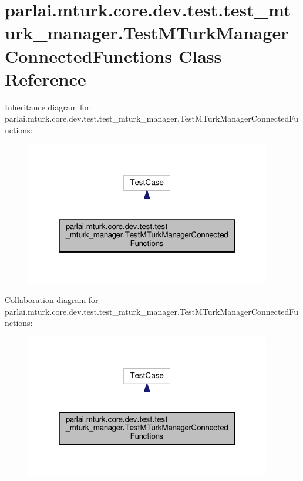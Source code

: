 \hypertarget{classparlai_1_1mturk_1_1core_1_1dev_1_1test_1_1test__mturk__manager_1_1TestMTurkManagerConnectedFunctions}{}\section{parlai.\+mturk.\+core.\+dev.\+test.\+test\+\_\+mturk\+\_\+manager.\+Test\+M\+Turk\+Manager\+Connected\+Functions Class Reference}
\label{classparlai_1_1mturk_1_1core_1_1dev_1_1test_1_1test__mturk__manager_1_1TestMTurkManagerConnectedFunctions}


Inheritance diagram for parlai.\+mturk.\+core.\+dev.\+test.\+test\+\_\+mturk\+\_\+manager.\+Test\+M\+Turk\+Manager\+Connected\+Functions\+:
\nopagebreak
\begin{figure}[H]
\begin{center}
\leavevmode
\includegraphics[width=304pt]{d4/d2d/classparlai_1_1mturk_1_1core_1_1dev_1_1test_1_1test__mturk__manager_1_1TestMTurkManagerConnectedFunctions__inherit__graph}
\end{center}
\end{figure}


Collaboration diagram for parlai.\+mturk.\+core.\+dev.\+test.\+test\+\_\+mturk\+\_\+manager.\+Test\+M\+Turk\+Manager\+Connected\+Functions\+:
\nopagebreak
\begin{figure}[H]
\begin{center}
\leavevmode
\includegraphics[width=304pt]{d3/d55/classparlai_1_1mturk_1_1core_1_1dev_1_1test_1_1test__mturk__manager_1_1TestMTurkManagerConnectedFunctions__coll__graph}
\end{center}
\end{figure}
